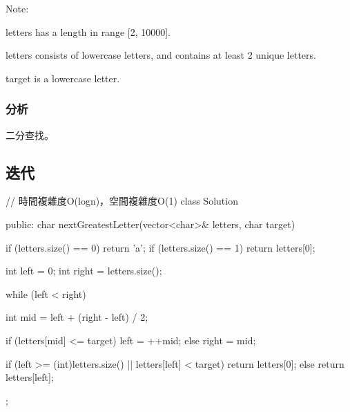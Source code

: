 Note:
\begindot
\item letters has a length in range [2, 10000].
\item letters consists of lowercase letters, and contains at least 2 unique letters.
\item target is a lowercase letter.
\myenddot


\subsubsection{分析}
二分查找。


\subsection{迭代}
\begin{Code}
// 時間複雜度O(logn)，空間複雜度O(1)
class Solution {
public:
    char nextGreatestLetter(vector<char>& letters, char target) {
        if (letters.size() == 0) return 'a';
        if (letters.size() == 1) return letters[0];

        int left = 0;
        int right = letters.size();

        while (left < right) {
            int mid = left + (right - left) / 2;

            if (letters[mid] <= target)
                left = ++mid;
            else
                right = mid;
        }

        if (left >= (int)letters.size() || letters[left] < target)
            return letters[0];
        else
            return letters[left];
    }
};
\end{Code}
